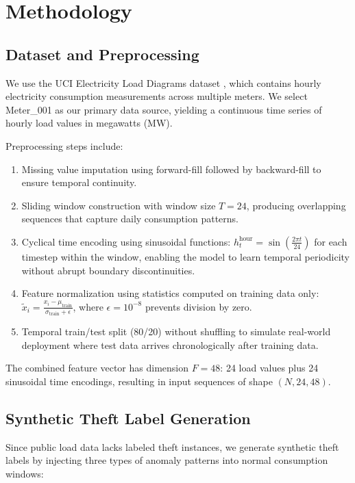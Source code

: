 \documentclass[journal]{IEEEtran}
\begin{document}
\section{Methodology}
\subsection{Dataset and Preprocessing}
We use the UCI Electricity Load Diagrams dataset \cite{jokar2016}, which contains hourly electricity consumption measurements across multiple meters. We select Meter\_001 as our primary data source, yielding a continuous time series of hourly load values in megawatts (MW).

Preprocessing steps include:
\begin{enumerate}
    \item Missing value imputation using forward-fill followed by backward-fill to ensure temporal continuity.
    \item Sliding window construction with window size $T = 24$, producing overlapping sequences that capture daily consumption patterns.
    \item Cyclical time encoding using sinusoidal functions: $h_t^{\text{hour}} = \sin\left(\frac{2\pi t}{24}\right)$ for each timestep within the window, enabling the model to learn temporal periodicity without abrupt boundary discontinuities.
    \item Feature normalization using statistics computed on training data only: $\tilde{x}_i = \frac{x_i - \mu_{\text{train}}}{\sigma_{\text{train}} + \epsilon}$, where $\epsilon = 10^{-8}$ prevents division by zero.
    \item Temporal train/test split (80/20) without shuffling to simulate real-world deployment where test data arrives chronologically after training data.
\end{enumerate}

The combined feature vector has dimension $F = 48$: 24 load values plus 24 sinusoidal time encodings, resulting in input sequences of shape $(N, 24, 48)$.

\subsection{Synthetic Theft Label Generation}
Since public load data lacks labeled theft instances, we generate synthetic theft labels by injecting three types of anomaly patterns into normal consumption windows:
\end{document}
